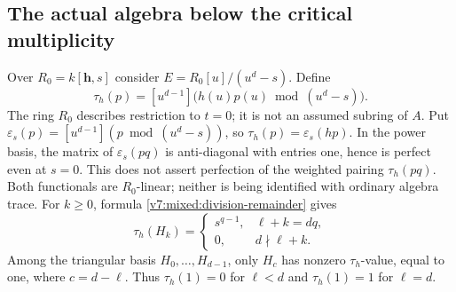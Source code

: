 \documentclass[10pt,fleqn]{article}
\numberwithin{equation}{section}
\begin{document}
\subsection{The actual algebra below the critical multiplicity}
\label{r22:mixed:subcritical}

Over $R_0=k[\mathbf h,s]$ consider
$E=R_0[u]/(u^d-s)$.  Define
\begin{equation}\label{v7:mixed:trace}
 \tau_h(p)=[u^{d-1}]\bigl(h(u)p(u)\bmod(u^d-s)\bigr).
\end{equation}
The ring $R_0$ describes restriction to $t=0$; it is not an assumed
subring of $A$.  Put
$\varepsilon_s(p)=[u^{d-1}](p\bmod(u^d-s))$, so
$\tau_h(p)=\varepsilon_s(hp)$.  In the power basis, the matrix of
$\varepsilon_s(pq)$ is anti-diagonal with entries one, hence is perfect
even at $s=0$.  This does not assert perfection of the weighted pairing
$\tau_h(pq)$.  Both functionals are $R_0$-linear; neither is being
identified with ordinary algebra trace.  For $k\ge0$, formula \eqref{v7:mixed:division-remainder} gives
\begin{equation}\label{v7:mixed:trace-H}
 \tau_h(H_k)=
 \begin{cases}s^{q-1},&\ell+k=dq,\\0,&d\nmid\ell+k.\end{cases}
\end{equation}
Among the triangular basis $H_0,\ldots,H_{d-1}$, only $H_c$ has
nonzero $\tau_h$-value, equal to one, where $c=d-\ell$.  Thus $\tau_h(1)=0$
for $\ell<d$ and $\tau_h(1)=1$ for $\ell=d$.
\end{document}
